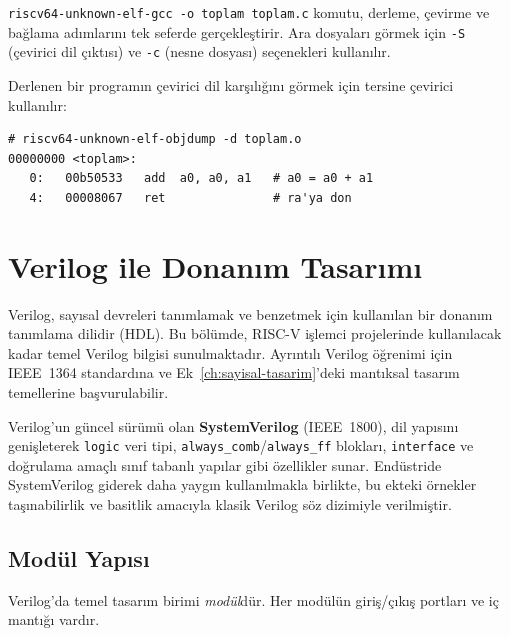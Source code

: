 \begin{bilginot}
\texttt{riscv64-unknown-elf-gcc -o toplam toplam.c} komutu, derleme, çevirme ve bağlama adımlarını tek seferde gerçekleştirir. Ara dosyaları görmek için \texttt{-S} (çevirici dil çıktısı) ve \texttt{-c} (nesne dosyası) seçenekleri kullanılır.
\end{bilginot}

Derlenen bir programın çevirici dil karşılığını görmek için tersine çevirici kullanılır:

\begin{lstlisting}[style=riscv, caption={Tersine çevirici çıktısı örneği}, label={lst:ekd-objdump}]
# riscv64-unknown-elf-objdump -d toplam.o
00000000 <toplam>:
   0:   00b50533   add  a0, a0, a1   # a0 = a0 + a1
   4:   00008067   ret               # ra'ya don
\end{lstlisting}


\section{Verilog ile Donanım Tasarımı}
\label{sec:ekd-verilog}

Verilog, sayısal devreleri tanımlamak ve benzetmek için kullanılan bir donanım tanımlama dilidir (HDL). Bu bölümde, RISC-V işlemci projelerinde kullanılacak kadar temel Verilog bilgisi sunulmaktadır. Ayrıntılı Verilog öğrenimi için IEEE~1364 standardına ve Ek~\ref{ch:sayisal-tasarim}'deki mantıksal tasarım temellerine başvurulabilir.

Verilog'un güncel sürümü olan \textbf{SystemVerilog} (IEEE~1800), dil yapısını genişleterek \texttt{logic} veri tipi, \texttt{always\_comb}/\texttt{always\_ff} blokları, \texttt{interface} ve doğrulama amaçlı sınıf tabanlı yapılar gibi özellikler sunar. Endüstride SystemVerilog giderek daha yaygın kullanılmakla birlikte, bu ekteki örnekler taşınabilirlik ve basitlik amacıyla klasik Verilog söz dizimiyle verilmiştir.

\subsection{Modül Yapısı}
\label{sec:ekd-modul}

Verilog'da temel tasarım birimi \emph{modül}dür. Her modülün giriş/çıkış portları ve iç mantığı vardır.

